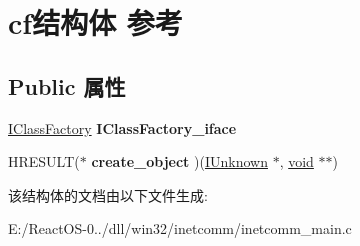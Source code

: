 \hypertarget{structcf}{}\section{cf结构体 参考}
\label{structcf}
\subsection*{Public 属性}
\begin{DoxyCompactItemize}
\item 
\mbox{\label{structcf_ab35f510d2dda28342f96eac2349450c7}} 
\hyperlink{interface_i_class_factory}{I\+Class\+Factory} {\bfseries I\+Class\+Factory\+\_\+iface}
\item 
\mbox{\label{structcf_a5094a0f49490e5f415e42b8756c30290}} 
H\+R\+E\+S\+U\+LT($\ast$ {\bfseries create\+\_\+object} )(\hyperlink{interface_i_unknown}{I\+Unknown} $\ast$, \hyperlink{interfacevoid}{void} $\ast$$\ast$)
\end{DoxyCompactItemize}


该结构体的文档由以下文件生成\+:\begin{DoxyCompactItemize}
\item 
E\+:/\+React\+O\+S-\/0../dll/win32/inetcomm/inetcomm\+\_\+main.\+c\end{DoxyCompactItemize}
